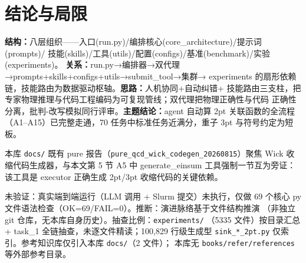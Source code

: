 \documentclass[UTF8]{ctexart}
\begin{document}
\section{结论与局限}

\begin{conclbox}
\textbf{结构：}八层组织——入口(run.py)/编排核心(core\_architecture)/提示词(prompts)/
技能(skills)/工具(utils)/配置(configs)/基准(benchmark)/实验(experiments)。
\textbf{关系：}run.py→编排器→双代理→prompts+skills+configs+utils→submit\_tool→集群→
experiments 的扇形依赖链，技能路由为数据驱动枢轴。\textbf{思路：}人机协同+自动纠错+
技能路由三支柱，把专家物理推理与代码工程编码为可复现管线；双代理把物理正确性与代码
正确性分离，批判-改写模拟同行评审。\textbf{主题结论：}agent 自动算 2pt 关联函数的全流程
（A1–A15）已完整走通，70 任务中标准任务近满分，重子 3pt 与符号约定为短板。
\end{conclbox}

\begin{refbox}
本库 \texttt{docs/} 既有 pure 报告（\texttt{pure\_qcd\_wick\_codegen\_20260815}）聚焦
Wick 收缩代码生成器，与本文第 5 节 A5 中 generate\_einsum 工具强制一节互为旁证：
该工具是 executor 正确生成 2pt/3pt 收缩代码的关键依赖。
\end{refbox}

\begin{warnbox}
\textcolor{warn}{未验证}：真实端到端运行（LLM 调用 + Slurm 提交）未执行，仅做 69 个核心
py 文件语法检查（OK=69/FAIL=0）。\textcolor{warn}{推断}：演进脉络基于文件结构推演
（非独立 git 仓库，无本库自身历史）。\textcolor{warn}{抽查比例}：\texttt{experiments/}
（5335 文件）按目录汇总 + task\_1 全链抽查，未逐文件精读；100,829 行级生成型
\texttt{sink\_*\_2pt.py} 仅索引。参考知识库仅引入本库 \texttt{docs/}（2 文件）；
本库无 \texttt{books/refer/references} 等外部参考目录。
\end{warnbox}
\end{document}
